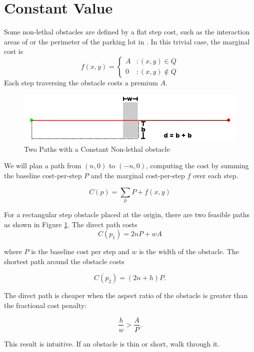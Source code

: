 \section{Constant Value}
Some non-lethal obstacles are defined by a flat step cost, such as the interaction areas of \citet{fraichard:anthronav} or the perimeter of the parking lot in \citet{likhachev:costmaps}. In this trivial case, the marginal cost is
\begin{equation}
   \displaystyle
   f(x, y) = \left\{
     \begin{array}{lr}
       A & : (x,y) \in Q\\
       0 & : (x,y) \notin Q
     \end{array}
   \right.
\end{equation}
Each step traversing the obstacle costs a premium $A$. 

\begin{figure}[!t]
\includegraphics[width=\columnwidth]{graphix/Constant.png}
\caption{Two Paths with a Constant Non-lethal obstacle}
\label{fig:constant}
\end{figure}

We will plan a path from $(n, 0)$ to $(-n, 0)$, computing the cost by summing the baseline cost-per-step $P$ and the marginal cost-per-step $f$ over each step.

\begin{equation}
C(p) = \sum\limits_p P + f(x, y)
\end{equation}

For a rectangular step obstacle placed at the origin, there are two feasible paths as shown in Figure \ref{fig:constant}. The direct path costs
\begin{equation}
C(p_1) = 2nP + wA
\end{equation}

where $P$ is the baseline cost per step and $w$ is the width of the obstacle. The shortest path around the obstacle costs

\begin{equation}
C(p_2) = (2n + h)P.
\end{equation}

The direct path is cheaper when the aspect ratio of the obstacle  is greater than the fractional cost penalty:

\begin{equation}
\frac{h}{w} > \frac{A}{P}.
\end{equation}

This result is intuitive. If an obstacle is thin or short, walk through it.




